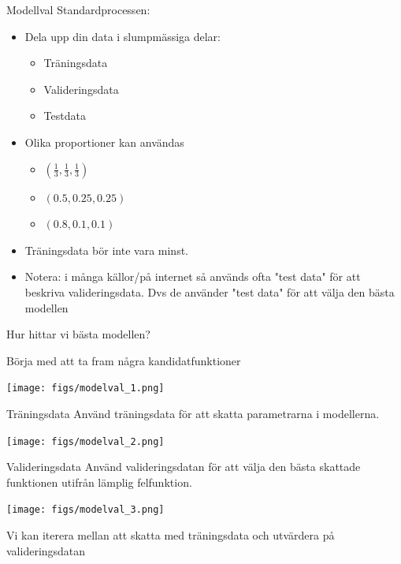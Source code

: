 \documentclass[10pt,english]{beamer}
\begin{document}
\begin{frame}{Modellval}
    Standardprocessen:
    \begin{itemize}
        \item Dela upp din data i slumpmässiga delar:
        \begin{itemize}
            \item Träningsdata
            \item Valideringsdata
            \item Testdata
        \end{itemize}
        \item Olika proportioner kan användas
        \begin{itemize}
            \item $(\tfrac{1}{3}, \tfrac{1}{3}, \tfrac{1}{3})$
            \item $(0.5, 0.25, 0.25)$
            \item $(0.8, 0.1, 0.1)$
        \end{itemize}
        \item Träningsdata bör inte vara minst.
        \item Notera: i många källor/på internet så används ofta "test data" för att beskriva valideringsdata. Dvs de använder "test data" för att välja den bästa modellen
    \end{itemize}
\end{frame}

\begin{frame}{Hur hittar vi bästa modellen?}
    
    Börja med att ta fram några kandidatfunktioner

    \texttt{[image: figs/modelval\_1.png]}

\end{frame}

\begin{frame}{Träningsdata}
    Använd träningsdata för att skatta parametrarna i modellerna.

    \texttt{[image: figs/modelval\_2.png]}
\end{frame}

\begin{frame}{Valideringsdata}
    Använd valideringsdatan för att välja den bästa skattade funktionen utifrån lämplig felfunktion. 

    \texttt{[image: figs/modelval\_3.png]}

    Vi kan iterera mellan att skatta med träningsdata och utvärdera på valideringsdatan

\end{frame}
\end{document}
